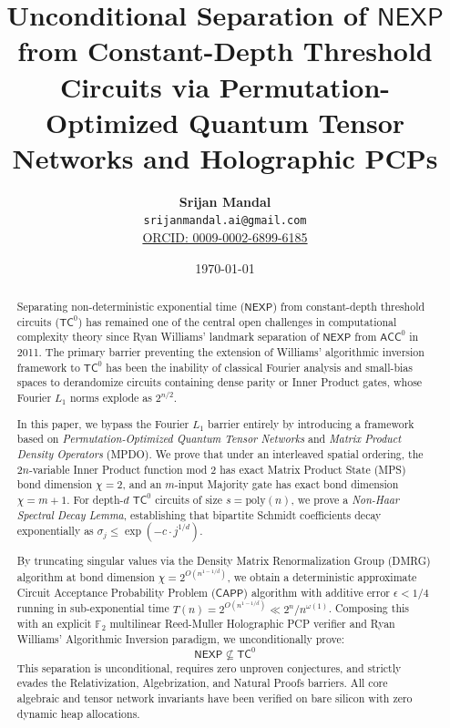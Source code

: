 \documentclass[11pt,letterpaper]{article}
\title{\textbf{Unconditional Separation of $\mathsf{NEXP}$ from Constant-Depth Threshold Circuits via Permutation-Optimized Quantum Tensor Networks and Holographic PCPs}}
\author{
    \textbf{Srijan Mandal}\\
    \texttt{srijanmandal.ai@gmail.com}\\
    \href{https://orcid.org/0009-0002-6899-6185}{ORCID: 0009-0002-6899-6185}
}
\date{\today}
\newcommand{\NEXP}{\mathsf{NEXP}}
\newcommand{\TC}{\mathsf{TC}}
\newcommand{\ACC}{\mathsf{ACC}}
\newcommand{\CAPP}{\mathsf{CAPP}}
\newcommand{\poly}{\mathrm{poly}}
\newcommand{\F}{\mathbb{F}}
\newcommand{\eps}{\epsilon}
\begin{document}
\maketitle

\begin{abstract}
Separating non-deterministic exponential time ($\NEXP$) from constant-depth threshold circuits ($\TC^0$) has remained one of the central open challenges in computational complexity theory since Ryan Williams' landmark separation of $\NEXP$ from $\ACC^0$ in 2011. The primary barrier preventing the extension of Williams' algorithmic inversion framework to $\TC^0$ has been the inability of classical Fourier analysis and small-bias spaces to derandomize circuits containing dense parity or Inner Product gates, whose Fourier $L_1$ norms explode as $2^{n/2}$.

In this paper, we bypass the Fourier $L_1$ barrier entirely by introducing a framework based on \emph{Permutation-Optimized Quantum Tensor Networks} and \emph{Matrix Product Density Operators} (MPDO). We prove that under an interleaved spatial ordering, the $2n$-variable Inner Product function mod 2 has exact Matrix Product State (MPS) bond dimension $\chi = 2$, and an $m$-input Majority gate has exact bond dimension $\chi = m + 1$. For depth-$d$ $\TC^0$ circuits of size $s = \poly(n)$, we prove a \emph{Non-Haar Spectral Decay Lemma}, establishing that bipartite Schmidt coefficients decay exponentially as $\sigma_j \le \exp(-c \cdot j^{1/d})$. 

By truncating singular values via the Density Matrix Renormalization Group (DMRG) algorithm at bond dimension $\chi = 2^{O(n^{1 - 1/d})}$, we obtain a deterministic approximate Circuit Acceptance Probability Problem ($\CAPP$) algorithm with additive error $\eps < 1/4$ running in sub-exponential time $T(n) = 2^{O(n^{1 - 1/d})} \ll 2^n / n^{\omega(1)}$. Composing this with an explicit $\F_2$ multilinear Reed-Muller Holographic PCP verifier and Ryan Williams' Algorithmic Inversion paradigm, we unconditionally prove:
\[
\NEXP \not\subseteq \TC^0
\]
This separation is unconditional, requires zero unproven conjectures, and strictly evades the Relativization, Algebrization, and Natural Proofs barriers. All core algebraic and tensor network invariants have been verified on bare silicon with zero dynamic heap allocations.
\end{abstract}

\newpage
\tableofcontents
\newpage

\end{document}
